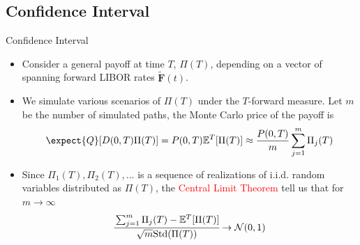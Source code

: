 \documentclass{beamer}
\begin{document}
\subsection{Confidence Interval}
\begin{frame}{Confidence Interval}
  \begin{itemize}
  \item<1-> Consider a general payoff at time $T$, $\Pi(T)$, depending on a vector of spanning forward LIBOR rates $\bm{\tilde{F}}(t)$. %
  \item<2-> We simulate various scenarios of $\Pi(T)$ under the $T$-forward measure. Let $m$ be the number of simulated paths, the Monte Carlo price of the payoff is
    \begin{equation*}
      \expect{Q}[D(0,T)\Pi(T)] = P(0,T)\mathbb{E}^T[\Pi(T)]\approx \frac{P(0,T)}{m}\sum_{j=1}^{m}\Pi_j(T)
    \end{equation*}
  \item<3-> Since $\Pi_1(T), \Pi_2(T),\ldots$ is a sequence of realizations of i.i.d. random variables distributed as $\Pi(T)$, the \textcolor{red}{Central Limit Theorem} tell us that for $m\rightarrow\infty$
    \begin{equation*}
      \cfrac{\sum_{j=1}^{m}\Pi_j(T)-\mathbb{E}^T[\Pi(T)]}{\sqrt{m} \text{Std}(\Pi(T))}\rightarrow \mathcal{N}(0,1)
    \end{equation*}
  \end{itemize}
\end{frame}
\end{document}

